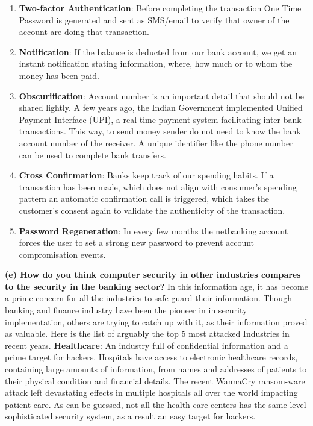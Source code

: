 \documentclass{article}
\begin{document}
\begin{enumerate}
\item \textbf{Two-factor Authentication}: Before completing the transaction One Time Password is generated and sent as SMS/email to verify that owner of the account are doing that transaction.

\item \textbf{Notification}: If the balance is deducted from our bank account, we get an instant notification stating information, where, how much or to whom the money has been paid.

\item \textbf{Obscurification}:  Account number is an important detail that should not be shared lightly. A few years ago, the Indian Government implemented Unified Payment Interface (UPI), a real-time payment system facilitating inter-bank transactions. This way, to send money sender do not need to know the bank account number of the receiver. A unique identifier like the phone number can be used to complete bank transfers.

\item \textbf{Cross Confirmation}: Banks keep track of our spending habits. If a transaction has been made, which does not align with consumer's spending pattern an automatic confirmation call is triggered, which takes the customer's consent again to validate the authenticity of the transaction.

\item \textbf{Password Regeneration}: In every few months the netbanking account forces the user to set a strong new password to prevent account compromisation events.
\end{enumerate}
\newline \newline \textbf{(e) How do you think computer security in other industries compares to the security in the banking sector?}
\newline \newilne In this information age, it has become a prime concern for all the industries to safe guard their information. Though banking and finance industry have been the pioneer in in security implementation, others are trying to catch up with it, as their information proved as valuable. Here is the  list of arguably the top 5 most attacked Industries in recent years.
\newline \newline \textbf{Healthcare}: An industry full of confidential information and a prime target for hackers. Hospitals have access to electronic healthcare records, containing large amounts of information, from names and addresses of patients to their physical condition and financial details. The recent WannaCry ransom-ware attack left devastating effects in multiple hospitals all over the world impacting patient care. As can be guessed, not all the health care centers has the same level sophisticated security system, as a result an easy target for hackers.
\end{document}
